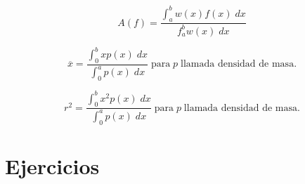     \begin{def.}
	$$A(f) = \dfrac{\int_a^b w(x)f(x)\; dx}{f_a^b w(x)\; dx}$$
    \end{def.}

    \begin{def.}
	$$\overline{x}=\dfrac{\int_0^b xp(x)\; dx}{\int_0^a p(x)\; dx} \; \mbox{para}\; p \; \mbox{llamada densidad de masa}.$$
    \end{def.}

    \begin{def.}
	$$r^2=\dfrac{\int_0^b x^2p(x)\; dx}{\int_0^a p(x)\; dx} \; \mbox{para}\; p \; \mbox{llamada densidad de masa}.$$
    \end{def.}


\section{Ejercicios}

